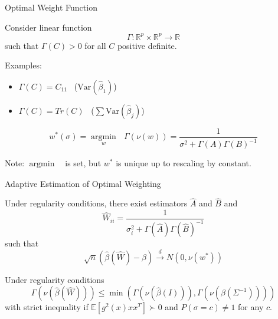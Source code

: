 \documentclass[12pt]{beamer}
\newcommand{\argmin}[1]{\underset{#1}{\operatorname{argmin}}\text{ }}
\newcommand{\Var}{\text{Var}}
\newcommand{\E}{\mathbb{E}}
\newcommand{\rightarrowd}{\overset{d}{\to}}
\begin{document}
\begin{frame}{Optimal Weight Function}

  Consider linear function
  \begin{equation*}
    \Gamma: \mathbb{R}^p \times \mathbb{R}^p \rightarrow \mathbb{R}
  \end{equation*}
  such that $\Gamma(C) > 0$ for all $C$ positive definite.

\vspace{.2in}
  
  Examples:
  \begin{itemize}
  \item $\Gamma(C) = C_{11} \, \, \,$ ($\Var(\widehat{\beta}_1)$)
  \item $\Gamma(C) = Tr(C) \, \, \,$ ($\sum \Var(\widehat{\beta}_j)$)
  \end{itemize}

  
  \begin{theorem}
    \begin{equation*}
      w^*(\sigma) = \argmin{w} \Gamma(\nu(w)) = \frac{1}{\sigma^2 + \Gamma(A)\Gamma(B)^{-1}}
    \end{equation*}
  \end{theorem}

Note: $\argmin{}$ is set, but $w^*$ is unique up to rescaling by constant.
  
\end{frame}
  
  \begin{frame}{Adaptive Estimation of Optimal Weighting}
    \begin{theorem}
      Under regularity conditions, there exist estimators $\widehat{A}$ and $\widehat{B}$ and
      \begin{equation*}
        \widehat{W}_{ii} = \frac{1}{\sigma_i^2 + \Gamma(\widehat{A})\Gamma(\widehat{B})^{-1}}
      \end{equation*}
      such that
      \begin{equation*}
        \sqrt{n}(\widehat{\beta}(\widehat{W}) - \beta) \rightarrowd N(0,\nu(w^*))
      \end{equation*}
      \end{theorem}
    \begin{theorem}
      Under regularity conditions
      \begin{equation*}
        \Gamma(\nu(\widehat{\beta}(\widehat{W}))) \leq \min(\Gamma(\nu(\widehat{\beta}(I))),\Gamma(\nu(\widehat{\beta}(\Sigma^{-1}))))
      \end{equation*}
      with strict inequality if $\E[g^2(x)xx^T]\succ 0$ and $P(\sigma=c)\neq 1$ for any $c$.
      \end{theorem}

    
  \end{frame}
  
\end{document}
